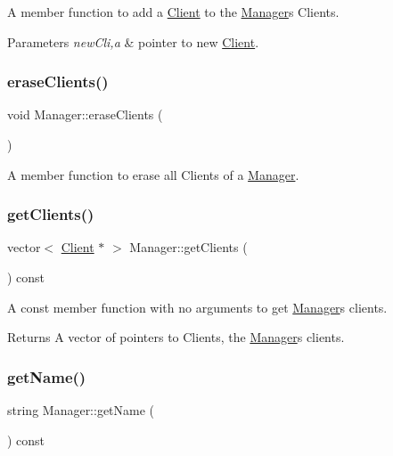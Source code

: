 A member function to add a \hyperlink{class_client}{Client} to the \hyperlink{class_manager}{Manager}\textquotesingle{}s Clients. 
\begin{DoxyParams}{Parameters}
{\em new\+Cli,a} & pointer to new \hyperlink{class_client}{Client}. \\
\hline
\end{DoxyParams}
\hypertarget{class_manager_ae0cc7db4e0550368657fe7c2d7d397ef}{}\label{class_manager_ae0cc7db4e0550368657fe7c2d7d397ef} 
\subsubsection{\texorpdfstring{erase\+Clients()}{eraseClients()}}
{\footnotesize\ttfamily void Manager\+::erase\+Clients (\begin{DoxyParamCaption}{ }\end{DoxyParamCaption})}

A member function to erase all Clients of a \hyperlink{class_manager}{Manager}. \hypertarget{class_manager_ac72967b5719ee6f9461923bedc8d47b7}{}\label{class_manager_ac72967b5719ee6f9461923bedc8d47b7} 
\subsubsection{\texorpdfstring{get\+Clients()}{getClients()}}
{\footnotesize\ttfamily vector$<$ \hyperlink{class_client}{Client} $\ast$ $>$ Manager\+::get\+Clients (\begin{DoxyParamCaption}{ }\end{DoxyParamCaption}) const}

A const member function with no arguments to get \hyperlink{class_manager}{Manager}\textquotesingle{}s clients. \begin{DoxyReturn}{Returns}
A vector of pointers to Clients, the \hyperlink{class_manager}{Manager}\textquotesingle{}s clients. 
\end{DoxyReturn}
\hypertarget{class_manager_ae351774d9435b59ece5d1287e9056a02}{}\label{class_manager_ae351774d9435b59ece5d1287e9056a02} 
\subsubsection{\texorpdfstring{get\+Name()}{getName()}}
{\footnotesize\ttfamily string Manager\+::get\+Name (\begin{DoxyParamCaption}{ }\end{DoxyParamCaption}) const}

